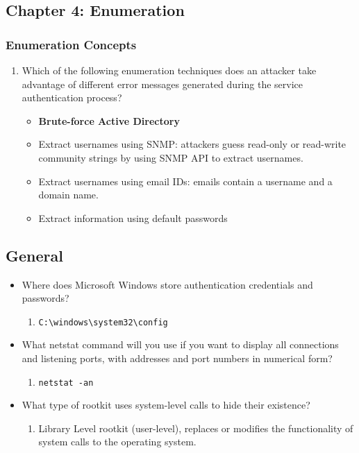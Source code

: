 \subsection{Chapter 4: Enumeration}
\subsubsection{Enumeration Concepts}
\begin{enumerate}
    \item Which of the following enumeration techniques does an attacker take advantage of different error messages generated during the service authentication process?
    \begin{itemize}
        \item \textbf{Brute-force Active Directory}
        \item Extract usernames using SNMP: attackers guess read-only or read-write community strings by using SNMP API to extract usernames.
        \item Extract usernames using email IDs: emails contain a username and a domain name.
        \item Extract information using default passwords
    \end{itemize}
\end{enumerate}

\subsection{General}
\begin{itemize}
    \item Where does Microsoft Windows store authentication credentials and passwords?
    \begin{enumerate}
        \item \verb|C:\windows\system32\config|
    \end{enumerate}
    \item What netstat command will you use if you want to display all connections and listening ports, with addresses and port numbers in numerical form?
    \begin{enumerate}
        \item \verb|netstat -an|
    \end{enumerate}
    \item What type of rootkit uses system-level calls to hide their existence?
    \begin{enumerate}
        \item Library Level rootkit (user-level), replaces or modifies the functionality of system calls to the operating system.
    \end{enumerate}
\end{itemize}